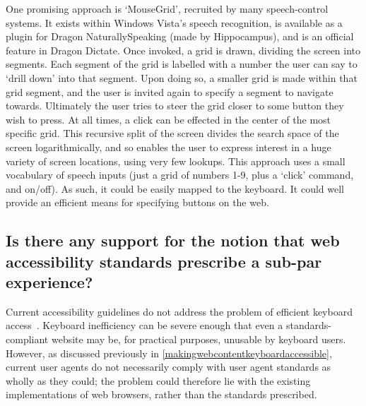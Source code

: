 \documentclass[a4paper, 11pt]{article}
\begin{document}
One promising approach is `MouseGrid', recruited by many speech-control systems. It exists within Windows Vista's speech recognition, is available as a plugin for Dragon NaturallySpeaking (made by Hippocampus), and is an official feature in Dragon Dictate. Once invoked, a grid is drawn, dividing the screen into segments. Each segment of the grid is labelled with a number the user can say to `drill down' into that segment. Upon doing so, a smaller grid is made within that grid segment, and the user is invited again to specify a segment to navigate towards. Ultimately the user tries to steer the grid closer to some button they wish to press.
At all times, a click can be effected in the center of the most specific grid. This recursive split of the screen divides the search space of the screen logarithmically, and so enables the user to express interest in a huge variety of screen locations, using very few lookups.
This approach uses a small vocabulary of speech inputs (just a grid of numbers 1-9, plus a `click' command, and on/off). As such, it could be easily mapped to the keyboard. It could well provide an efficient means for specifying buttons on the web.
\subsection{Is there any support for the notion that web accessibility standards prescribe a sub-par experience?}
\label{subparstandards}
Current accessibility guidelines do not address the problem of efficient keyboard access~\cite{schrepp2006efficiency}. Keyboard inefficiency can be severe enough that even a standards-compliant website may be, for practical purposes, unusable by keyboard users\cite{schrepp2006efficiency,coyne2001beyond,powlik2002accessibility}. However, as discussed previously in \cref{makingwebcontentkeyboardaccessible}, current user agents do not necessarily comply with user agent standards as wholly as they could; the problem could therefore lie with the existing implementations of web browsers, rather than the standards prescribed.
\end{document}
